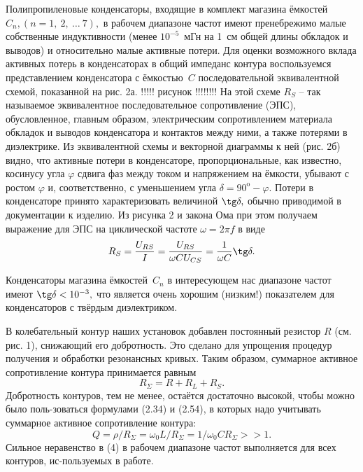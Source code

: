 Полипропиленовые конденсаторы, входящие в комплект магазина ёмкостей  $C_n,(n=1,~2,~\ldots~7),$ в рабочем диапазоне частот имеют пренебрежимо малые собственные индуктивности (менее $10^{-5}$~мГн на 1~см общей длины обкладок и выводов) и относительно малые активные потери. Для оценки возможного вклада активных потерь в конденсаторах в общий импеданс контура воспользуемся представлением конденсатора с ёмкостью~$C$ последовательной эквивалентной схемой, показанной на рис. 2а.
!!!!!
рисунок
!!!!!!!!
На этой схеме $R_S$ – так называемое эквивалентное последовательное сопротивление (ЭПС), обусловленное, главным образом, электрическим сопротивлением материала обкладок и вы\-водов конденсатора и контактов между ними, а также потерями в диэлектрике. Из эквива\-лентной схемы и векторной диаграммы к ней (рис. 2б) видно, что активные потери в конденсаторе, пропорциональные, как известно, косинусу угла $\varphi$ сдвига фаз между током и напряжением на ёмкости, убывают с ростом $\varphi$ и, соответственно, с уменьшением угла $\delta=90^{\text{o}}-\varphi.$ Потери в конденсаторе принято характеризовать величиной $\tg\delta,$ обычно приводимой в документации к изделию. Из рисунка 2 и закона Ома при этом получаем выражение для ЭПС на циклической частоте $\omega=2\pi f$ в виде
\begin{equation}\label{eq1}
	R_S=\dfrac{U_{RS}}{I}=\dfrac{U_{RS}}{\omega CU_{CS}}=\dfrac{1}{\omega C}\tg\delta.
\end{equation}

Конденсаторы магазина ёмкостей~$C_n$ в интересующем нас диапазоне частот имеют $\tg\delta<10^{-3},$ что является очень хорошим (низким!) показателем для конденсаторов с твёрдым диэлектриком.

В колебательный контур наших установок добавлен постоянный резистор $R$ (см. рис. 1), снижающий его добротность. Это сделано для упрощения процедур получения и обработки резонансных кривых. Таким образом, суммарное активное сопротивление контура принима\-ется равным
\begin{equation}\label{eq2}
	R_{\Sigma}=R+R_L+R_S.
\end{equation}
Добротность контуров, тем не менее, остаётся достаточно высокой, чтобы можно было поль-зоваться формулами (2.34) и (2.54), в которых надо учитывать суммарное активное сопро\-тивление контура:
\begin{equation}\label{eq3}
	Q=\rho/R_{\Sigma}=\omega_0L/R_{\Sigma}=1/\omega_0CR_{\Sigma}>>1.
\end{equation}
Сильное неравенство в (4) в рабочем диапазоне частот выполняется для всех контуров, ис-пользуемых в работе.

